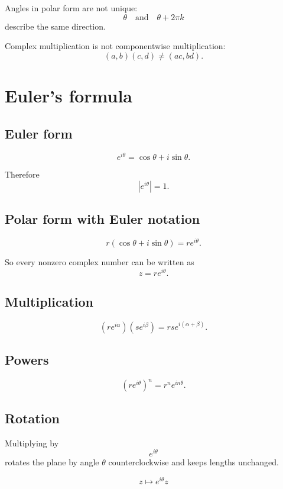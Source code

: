 Angles in polar form are not unique:
\[
    \theta
    \quad\text{and}\quad
    \theta+2\pi k
\]
describe the same direction.

Complex multiplication is not componentwise multiplication:
\[
    (a,b)(c,d)\ne(ac,bd).
\]

\section{Euler's formula}
\label{app:B.4}

\subsection*{Euler form}

\[
\boxed{
    e^{i\theta}=\cos\theta+i\sin\theta.
}
\]

Therefore
\[
\boxed{
    |e^{i\theta}|=1.
}
\]

\subsection*{Polar form with Euler notation}

\[
\boxed{
    r(\cos\theta+i\sin\theta)=re^{i\theta}.
}
\]

So every nonzero complex number can be written as
\[
\boxed{
    z=re^{i\theta}.
}
\]

\subsection*{Multiplication}

\[
\boxed{
    (re^{i\alpha})(se^{i\beta})=rs e^{i(\alpha+\beta)}.
}
\]

\subsection*{Powers}

\[
\boxed{
    (re^{i\theta})^n=r^n e^{in\theta}.
}
\]

\subsection*{Rotation}

Multiplying by
\[
    e^{i\theta}
\]
rotates the plane by angle \(\theta\) counterclockwise and keeps lengths unchanged.

\[
\boxed{
    z\mapsto e^{i\theta}z
}
\]

